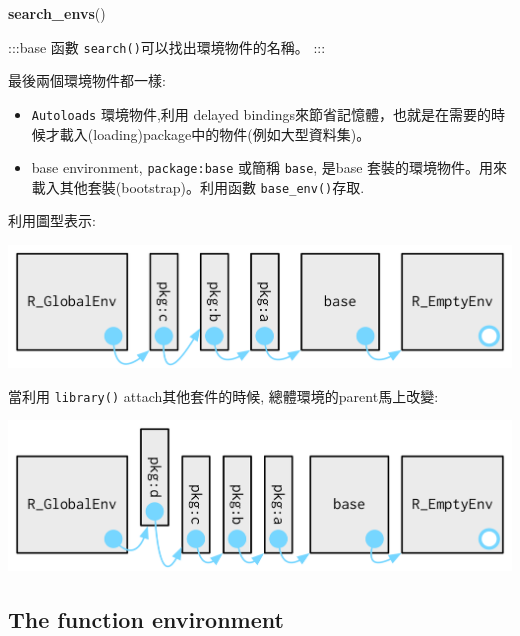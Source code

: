 \documentclass[]{book}
\newenvironment{Shaded}{\begin{snugshade}}{\end{snugshade}}
\newcommand{\KeywordTok}[1]{\textcolor[rgb]{0.13,0.29,0.53}{\textbf{#1}}}
\newcommand{\NormalTok}[1]{#1}
\theoremstyle{definition}
\theoremstyle{definition}
\theoremstyle{definition}
\theoremstyle{remark}
\begin{document}
\begin{Shaded}
\begin{Highlighting}[]
\KeywordTok{search_envs}\NormalTok{()}
\end{Highlighting}
\end{Shaded}

:::base 函數 \texttt{search()}可以找出環境物件的名稱。 :::

最後兩個環境物件都一樣:

\begin{itemize}
\item
  \texttt{Autoloads} 環境物件,利用 delayed
  bindings來節省記憶體，也就是在需要的時候才載入(loading)package中的物件(例如大型資料集)。
\item
  base environment, \texttt{package:base} 或簡稱 \texttt{base}, 是base
  套裝的環境物件。用來 載入其他套裝(bootstrap)。利用函數
  \texttt{base\_env()}存取.
\end{itemize}

利用圖型表示:

\begin{center}\includegraphics{diagrams/environments/search-path} \end{center}

當利用 \texttt{library()} attach其他套件的時候,
總體環境的parent馬上改變:

\begin{center}\includegraphics{diagrams/environments/search-path-2} \end{center}

\subsection{The function environment}\label{the-function-environment}
\end{document}
